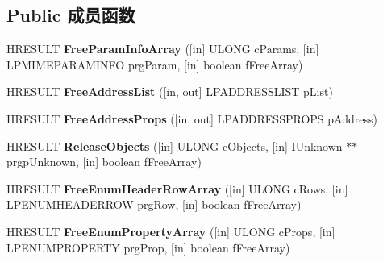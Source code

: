 \subsection*{Public 成员函数}
\begin{DoxyCompactItemize}
\item 
\mbox{\label{interface_m_i_m_e_o_l_e_1_1_i_mime_allocator_a80667d2a687784a28e9e5d60af6cfeae}} 
H\+R\+E\+S\+U\+LT {\bfseries Free\+Param\+Info\+Array} (\mbox{[}in\mbox{]} U\+L\+O\+NG c\+Params, \mbox{[}in\mbox{]} L\+P\+M\+I\+M\+E\+P\+A\+R\+A\+M\+I\+N\+FO prg\+Param, \mbox{[}in\mbox{]} boolean f\+Free\+Array)
\item 
\mbox{\label{interface_m_i_m_e_o_l_e_1_1_i_mime_allocator_a179d48fd19e045e4c9cd4a97eb0d583d}} 
H\+R\+E\+S\+U\+LT {\bfseries Free\+Address\+List} (\mbox{[}in, out\mbox{]} L\+P\+A\+D\+D\+R\+E\+S\+S\+L\+I\+ST p\+List)
\item 
\mbox{\label{interface_m_i_m_e_o_l_e_1_1_i_mime_allocator_a4cf7f6fa18844f1bc80f9f56a8d40f95}} 
H\+R\+E\+S\+U\+LT {\bfseries Free\+Address\+Props} (\mbox{[}in, out\mbox{]} L\+P\+A\+D\+D\+R\+E\+S\+S\+P\+R\+O\+PS p\+Address)
\item 
\mbox{\label{interface_m_i_m_e_o_l_e_1_1_i_mime_allocator_aef9b506345f6401936224e4cf69d6bf0}} 
H\+R\+E\+S\+U\+LT {\bfseries Release\+Objects} (\mbox{[}in\mbox{]} U\+L\+O\+NG c\+Objects, \mbox{[}in\mbox{]} \hyperlink{interface_i_unknown}{I\+Unknown} $\ast$$\ast$prgp\+Unknown, \mbox{[}in\mbox{]} boolean f\+Free\+Array)
\item 
\mbox{\label{interface_m_i_m_e_o_l_e_1_1_i_mime_allocator_afae114295442f3536173632b7cb50c17}} 
H\+R\+E\+S\+U\+LT {\bfseries Free\+Enum\+Header\+Row\+Array} (\mbox{[}in\mbox{]} U\+L\+O\+NG c\+Rows, \mbox{[}in\mbox{]} L\+P\+E\+N\+U\+M\+H\+E\+A\+D\+E\+R\+R\+OW prg\+Row, \mbox{[}in\mbox{]} boolean f\+Free\+Array)
\item 
\mbox{\label{interface_m_i_m_e_o_l_e_1_1_i_mime_allocator_a769c5cd22a681cc2b975b8692ed1dcb2}} 
H\+R\+E\+S\+U\+LT {\bfseries Free\+Enum\+Property\+Array} (\mbox{[}in\mbox{]} U\+L\+O\+NG c\+Props, \mbox{[}in\mbox{]} L\+P\+E\+N\+U\+M\+P\+R\+O\+P\+E\+R\+TY prg\+Prop, \mbox{[}in\mbox{]} boolean f\+Free\+Array)
$$
\end{DoxyCompactItemize}

